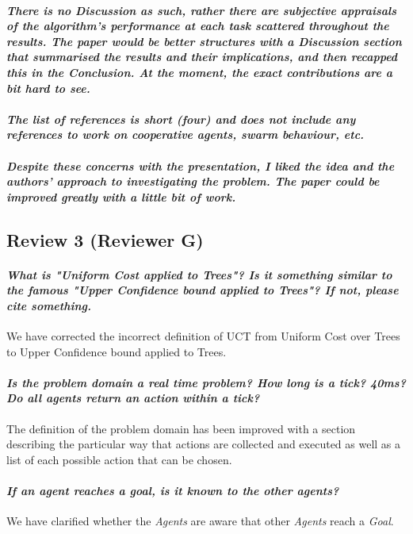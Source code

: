 \documentclass{article}
\begin{document}
\paragraph*{\textit{There is no Discussion as such, rather there are subjective appraisals of the algorithm's performance at each task scattered throughout the results. The paper would be better structures with a Discussion section that summarised the results and their implications, and then recapped this in the Conclusion. At the moment, the exact contributions are a bit hard to see.}}
\paragraph*{\textit{The list of references is short (four) and does not include any references to work on cooperative agents, swarm behaviour, etc.}}
\paragraph*{\textit{Despite these concerns with the presentation, I liked the idea and the authors' approach to investigating the problem. The paper could be improved greatly with a little bit of work.}}
\subsection{Review 3 (Reviewer G)}
\paragraph*{\textit{What is "Uniform Cost applied to Trees"? Is it something similar to the famous "Upper Confidence bound applied to Trees"? If not, please cite something.}}
We have corrected the incorrect definition of UCT from Uniform Cost over Trees to Upper Confidence bound applied to Trees.
\paragraph*{\textit{Is the problem domain a real time problem? How long is a tick? 40ms? Do all agents return an action within a tick?}}
The definition of the problem domain has been improved with a section describing the particular way that actions are collected and executed as well as a list of each possible action that can be chosen.
\paragraph*{\textit{If an agent reaches a goal, is it known to the other agents?}}
We have clarified whether the \emph{Agents} are aware that other \emph{Agents} reach a \emph{Goal}.
\end{document}
